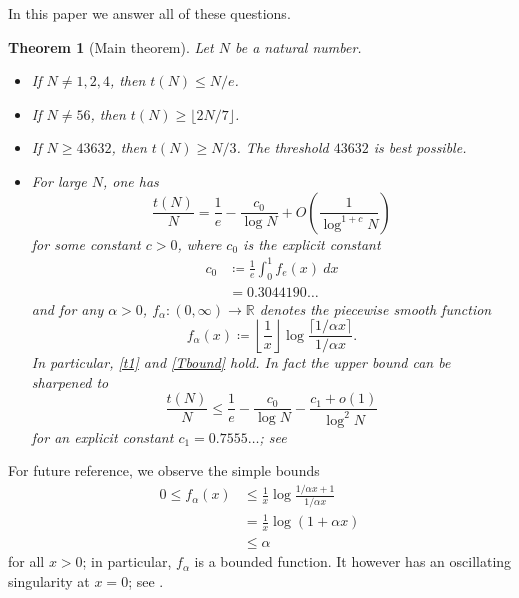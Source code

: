 \documentclass[12pt,a4paper,reqno]{amsart}
\numberwithin{equation}{section}
\theoremstyle{plain}
\newtheorem{theorem}{Theorem}[section]
\theoremstyle{definition}
\newcommand\R{\mathbb{R}}
\begin{document}
In this paper we answer all of these questions.

\begin{theorem}[Main theorem]\label{main} Let $N$ be a natural number.
\begin{itemize}
\item[(i)] If $N \neq 1,2,4$, then $t(N) \leq N/e$.
\item[(ii)]  If $N \neq 56$, then $t(N) \geq \lfloor 2N/7 \rfloor$.
\item[(iii)]  If $N \geq 43632$, then $t(N) \geq N/3$.  The threshold $43632$ is best possible.
\item[(iv)]  For large $N$, one has
  \begin{equation}\label{asym}
    \frac{t(N)}{N} = \frac{1}{e} - \frac{c_0}{\log N} + O\left( \frac{1}{\log^{1+c} N} \right)
  \end{equation}
for some constant $c>0$, where $c_0$ is the explicit constant
\begin{equation}\label{c0-def}
  \begin{split}
  c_0 &\coloneqq \frac{1}{e} \int_0^1 f_e(x)\ dx \\
  &= 0.3044190\dots
\end{split}
\end{equation}
and for any $\alpha>0$, $f_\alpha \colon (0,\infty) \to \R$ denotes the piecewise smooth function
\begin{equation}\label{falpha-def} 
  f_\alpha(x) \coloneqq \left\lfloor \frac{1}{x} \right\rfloor \log \frac{\lceil 1/\alpha x \rceil}{1/\alpha x}.
\end{equation}
In particular, \eqref{t1} and \eqref{Tbound} hold.  In fact the upper bound can be sharpened to
\begin{equation}\label{tna} 
  \frac{t(N)}{N} \leq \frac{1}{e} - \frac{c_0}{\log N} - \frac{c_1+o(1)}{\log^2 N} 
\end{equation}
for an explicit constant $c_1=0.7555\dots$; see 
\end{itemize}
\end{theorem}

For future reference, we observe the simple bounds
\begin{equation}\label{falpha-bound}
 \begin{split}
   0 \leq f_\alpha(x) &\leq \frac{1}{x} \log \frac{1/\alpha x+1}{1/\alpha x}\\
&= \frac{1}{x} \log\left( 1 + \alpha x \right) \\
&\leq \alpha
\end{split}
\end{equation}
for all $x>0$; in particular, $f_\alpha$ is a bounded function.  It however has an oscillating singularity at $x=0$; see .
\end{document}
